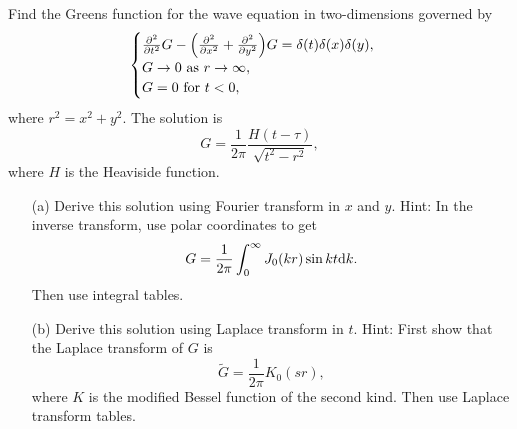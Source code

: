 \documentclass[12pt]{report}
\begin{document}
\newpage



\begin{problem}
    Find the Greens function for the wave equation in two-dimensions governed by
    \[  
        \begin{cases}
            \frac{\partial^{2} }{\partial t^{2}}G-{\left(\frac{\partial^{2} }{\partial x^{2}} + \frac{\partial^{2} }{\partial y^{2}}\right)}G = \delta(t)\delta(x)\delta(y),\\
            G \to 0 ~\text{as}~ r \to \infty,\\
            G = 0 ~\text{for}~ t<0,
        \end{cases}
    \]
    where $r^2 = x^2 + y^2$. The solution is 
    \[
        G = \frac{1}{2\pi} \frac{H(t-\tau)}{\sqrt{t^2 - r^2}},
    \]
    where $H$ is the Heaviside function. 
    \begin{enumerate}
        \item [(a)]
        Derive this solution using Fourier transform in $x$ and $y$.
        Hint: In the inverse transform, use polar coordinates to get
        \[
            G = \frac{1}{2\pi}\int_0^\infty J_0(k r)\sin{kt} {\mathrm{d}} k.
        \]    
        Then use integral tables. 

        \item [(b)]
        Derive this solution using Laplace transform in $t$.
        Hint: First show that the Laplace transform of $G$ is
        \[
            \tilde{G} = \frac{1}{2\pi}K_0(sr),
        \]
        where $K$ is the modified Bessel function of the second kind. Then use Laplace transform tables.


    \end{enumerate}
\end{problem}
\end{document}
